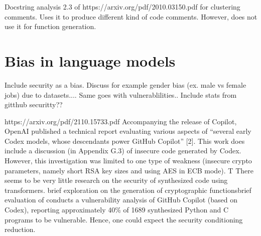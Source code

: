 Docstring analysis 2.3 of https://arxiv.org/pdf/2010.03150.pdf for clustering comments. Uses it to produce different kind of code comments. However, does not use it for function generation. 

\section{Bias in language models}
\label{sec:bias-in-language-models}
Include security as a bias. Discuss for example gender bias (ex. male vs female jobs) due to datasets.... Same goes with vulnerablilities.. Include stats from gitthub securitty??

https://arxiv.org/pdf/2110.15733.pdf
Accompanying the release of Copilot, OpenAI published
a technical report evaluating various aspects of “several early
Codex models, whose descendants power GitHub Copilot” [2].
This work does include a discussion (in Appendix G.3) of
insecure code generated by Codex. However, this investigation
was limited to one type of weakness (insecure crypto
parameters, namely short RSA key sizes and using AES in
ECB mode). T
There seems to be very little research on the security of synthesized code using transformers. \cite{chen2021codex} brief exploration on the generation of cryptographic functionsbrief evaluation of  \textcite{pearch2021asleep} conducts a vulnerability analysis of GitHub Copilot (based on Codex), reporting approximately 40\% of 1689 synthesized Python and C programs to be vulnerable. Hence, one could expect the security conditioning reduction. 










